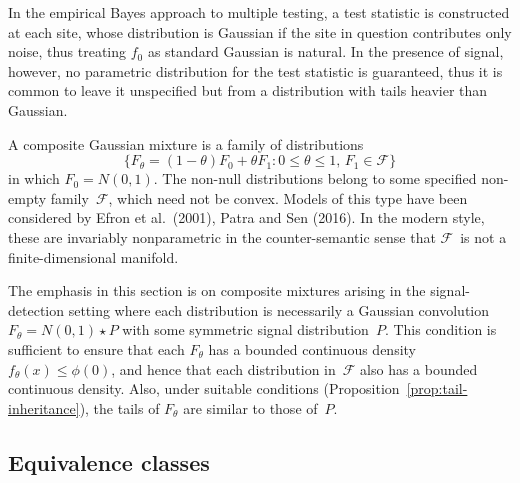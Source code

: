 \documentclass[11pt]{article}
\theoremstyle{definition}
\def\F{{\mathcal F}}
\begin{document}
In the empirical Bayes approach to multiple testing, a test statistic is constructed at each site, whose distribution is Gaussian if the site in question contributes only noise, thus treating $f_0$ as standard Gaussian is natural. In the presence of signal, however, no parametric distribution for the test statistic is guaranteed, thus it is common to leave it unspecified but from a distribution with tails heavier than Gaussian.

A composite Gaussian mixture is a  family of distributions
\[
\{F_\theta = (1-\theta)F_0 + \theta F_1 : 0 \le\theta\le 1,\, F_1 \in \F\}
\]
in which $F_0 = N(0,1)$.
The non-null distributions belong to some specified non-empty family~$\F$, which need not be convex.
Models of this type have been considered by Efron et al.~(2001), Patra and Sen (2016). In the modern style, these are invariably nonparametric in the counter-semantic sense that $\F$~is not a finite-dimensional manifold.

The emphasis in this section is on composite mixtures arising in the signal-detection setting where each distribution is
necessarily a Gaussian convolution $F_\theta = N(0, 1) \star P$ with some symmetric signal distribution~$P$.
This condition is sufficient to ensure that each $F_\theta$ has a bounded continuous density $f_\theta(x) \le \phi(0)$, and hence that
each distribution in~$\F$ also has a bounded continuous density.
Also, under suitable conditions (Proposition~\ref{prop:tail-inheritance}), the tails of $F_\theta$ are similar to those of~$P$.

\subsection{Equivalence classes}\label{equiv_class}
\end{document}
